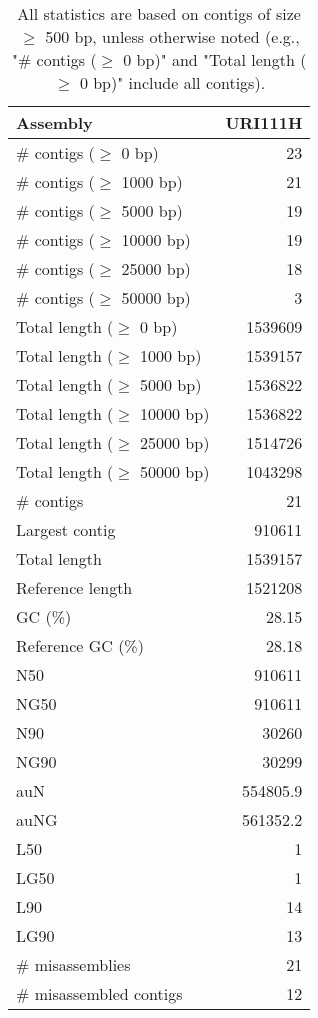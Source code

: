 \documentclass[12pt,a4paper]{article}
\begin{document}
\begin{table}[ht]
\begin{center}
\caption{All statistics are based on contigs of size $\geq$ 500 bp, unless otherwise noted (e.g., "\# contigs ($\geq$ 0 bp)" and "Total length ($\geq$ 0 bp)" include all contigs).}
\begin{tabular}{|l*{1}{|r}|}
\hline
Assembly & URI111H \\ \hline
\# contigs ($\geq$ 0 bp) & 23 \\ \hline
\# contigs ($\geq$ 1000 bp) & 21 \\ \hline
\# contigs ($\geq$ 5000 bp) & 19 \\ \hline
\# contigs ($\geq$ 10000 bp) & 19 \\ \hline
\# contigs ($\geq$ 25000 bp) & 18 \\ \hline
\# contigs ($\geq$ 50000 bp) & 3 \\ \hline
Total length ($\geq$ 0 bp) & 1539609 \\ \hline
Total length ($\geq$ 1000 bp) & 1539157 \\ \hline
Total length ($\geq$ 5000 bp) & 1536822 \\ \hline
Total length ($\geq$ 10000 bp) & 1536822 \\ \hline
Total length ($\geq$ 25000 bp) & 1514726 \\ \hline
Total length ($\geq$ 50000 bp) & 1043298 \\ \hline
\# contigs & 21 \\ \hline
Largest contig & 910611 \\ \hline
Total length & 1539157 \\ \hline
Reference length & 1521208 \\ \hline
GC (\%) & 28.15 \\ \hline
Reference GC (\%) & 28.18 \\ \hline
N50 & 910611 \\ \hline
NG50 & 910611 \\ \hline
N90 & 30260 \\ \hline
NG90 & 30299 \\ \hline
auN & 554805.9 \\ \hline
auNG & 561352.2 \\ \hline
L50 & 1 \\ \hline
LG50 & 1 \\ \hline
L90 & 14 \\ \hline
LG90 & 13 \\ \hline
\# misassemblies & 21 \\ \hline
\# misassembled contigs & 12 \\ \hline

\end{tabular}
\end{center}
\end{table}
\end{document}
